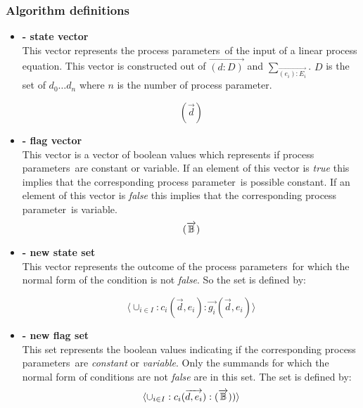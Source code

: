 \documentclass[a4paper,10pt]{article}
\newcommand{\lpe}{linear process equation}
\newcommand{\ovr}{\overrightarrow}
\newcommand{\pp}{process parameter}
\newcommand{\pps}{process parameters}
\newcommand{\ti}{\textit}
\begin{document}
\subsubsection{Algorithm definitions} \label{sss:algdef}
\begin{itemize}
\item \begin{defn} \textbf{- state vector}\\
This vector represents the \pps\ of the input of a \lpe . This
vector is constructed out of $\ovr{(d:D)}$ 
 and  $\sum_{\ovr{(e_i):E_i}}$. $D$ is the set of $d_0 \ldots d_n$ where $n$ is the number
of \pp .

\begin{displaymath}
(\ovr{d})
\end{displaymath}
\end{defn}

\item \begin{defn} \textbf{- flag vector}\\
This vector is a vector of boolean values which represents if \pps\
are constant or variable. If an element of this vector is \ti{true}
this implies that the corresponding \pp\ is possible constant. If an element
of this vector is \ti{false} this implies that the corresponding
\pp\ is variable.
\begin{displaymath}
(\ovr{\Bbb{B}})
\end{displaymath}
\end{defn}

\item \begin{defn} \textbf{- new state set}\\
 This vector represents the outcome of the
\pps\ for which the normal form of the condition is not \ti{false}. So
the set is defined by:

\begin{displaymath}\langle \cup_{i \in I}: c_i(\ovr{d},
e_i) :\ovr{g_i}(\ovr{d},e_i) \rangle
\end{displaymath}
\end{defn}

\item \begin{defn}
\textbf{- new flag set} \\
This set represents the boolean values indicating if the
corresponding \pps\ are \ti{constant} or \ti{variable}. Only the summands for
which the normal form of conditions are not \ti{false} are in this set. The set is
defined by:
\begin{displaymath}
\langle \cup_{i \in I}: c_i(\ovr{d, e_i}) : (\ovr{\Bbb{B}}) ) \rangle
\end{displaymath}
\end{defn}
\end{itemize}
\end{document}
